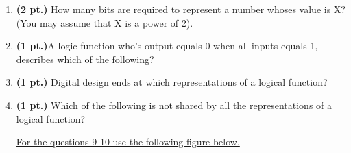\documentclass{article}
\begin{document}
\begin{enumerate}
\item {\bf (2 pt.)} How many bits are required to represent a number 
whoses value is X?  (You may assume that X is a power of 2).

\item {\bf (1 pt.)}A logic function who's output equals 0 when all
inputs equals 1, describes which of the following?

\item {\bf (1 pt.)} Digital design ends at which representations of a logical function?

\item {\bf (1 pt.)} Which of the following is not shared by all the 
representations of a logical function?

\pagebreak
\underline{For the questions 9-10 use the following figure below.}


\end{enumerate}
\end{document}
